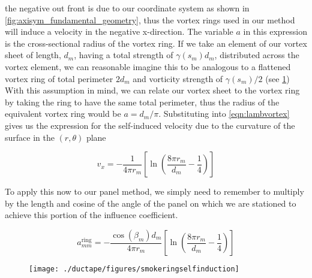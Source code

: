 \where the negative out front is due to our coordinate system as shown in \cref{fig:axisym_fundamental_geometry}, thus the vortex rings used in our method will induce a velocity in the negative x-direction.
The variable \(a\) in this expression is the cross-sectional radius of the vortex ring.
If we take an element of our vortex sheet of length, \(d_m\), having a total strength of \(\gamma(s_m)d_m\), distributed across the vortex element, we can reasonable imagine this to be analogous to a flattened vortex ring of total perimeter \(2d_m\) and vorticity strength of \(\gamma(s_m)/2\) (see \cref{fig:smokeringselfinduction})
With this assumption in mind, we can relate our vortex sheet to the vortex ring by taking the ring to have the same total perimeter, thus the radius of the equivalent vortex ring would be \(a = d_m / \pi\).
Substituting into \cref{eqn:lambvortex} gives us the expression for the self-induced velocity due to the curvature of the surface in the \((r,\theta)\) plane

\begin{equation}
    v_x = - \frac{1}{4 \pi r_m} \left[ \ln \left(\frac{8 \pi r_m}{d_m} - \frac{1}{4}\right)\right]
\end{equation}

\noindent To apply this now to our panel method, we simply need to remember to multiply by the length and cosine of the angle of the panel on which we are stationed to achieve this portion of the influence coefficient.

\begin{equation}
    a^\text{ring}_{mm} = - \frac{\cos(\beta_m)d_m}{4 \pi r_m} \left[ \ln \left(\frac{8 \pi r_m}{d_m} - \frac{1}{4}\right)\right]
\end{equation}

\begin{figure}[h!]
    \centering
    \texttt{[image: ./ductape/figures/smokeringselfinduction]}
    \caption{}
    \label{fig:smokeringselfinduction}
\end{figure}
